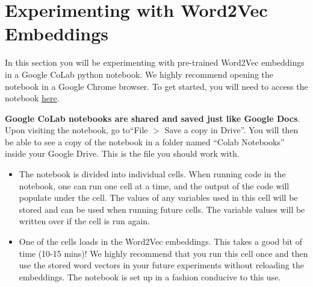 \section{Experimenting with Word2Vec Embeddings}

In this section you will be experimenting with pre-trained Word2Vec embeddings in a Google CoLab python notebook. We highly recommend opening the notebook in a Google Chrome browser. To get started, you will need to access the notebook \href{https://colab.research.google.com/drive/11KBXy43nQAUPSOyziSdYUtLmLPnnezC7}{here}.

\textbf{Google CoLab notebooks are shared and saved just like Google Docs}. Upon visiting the notebook, go to``File $>$ Save a copy in Drive''. You will then be able to see a copy of the notebook in a folder named “Colab Notebooks” inside your Google Drive. This is the file you should work with.

\begin{itemize}
    \item The notebook is divided into individual cells. When running code in the notebook, one can run one cell at a time, and the output of the code will populate under the cell. The values of any variables used in this cell will be stored and can be used when running future cells. The variable values will be written over if the cell is run again.  
    
    \item One of the cells loads in the Word2Vec embeddings. This takes a good bit of time (10-15 mins)! We highly recommend that you run this cell once and then use the stored word vectors in your future experiments without reloading the embeddings. The notebook is set up in a fashion conducive to this use.
\end{itemize}
\clearpage




